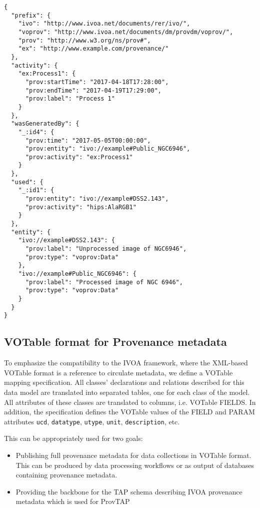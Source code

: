 \begin{verbatim}
{
  "prefix": {
    "ivo": "http://www.ivoa.net/documents/rer/ivo/",
    "voprov": "http://www.ivoa.net/documents/dm/provdm/voprov/",
    "prov": "http://www.w3.org/ns/prov#",
    "ex": "http://www.example.com/provenance/"
  },
  "activity": {
    "ex:Process1": {
      "prov:startTime": "2017-04-18T17:28:00",
      "prov:endTime": "2017-04-19T17:29:00",
      "prov:label": "Process 1"
    }
  },
  "wasGeneratedBy": {
    "_:id4": {
      "prov:time": "2017-05-05T00:00:00",
      "prov:entity": "ivo://example#Public_NGC6946",
      "prov:activity": "ex:Process1"
    }
  },
  "used": {
    "_:id1": {
      "prov:entity": "ivo://example#DSS2.143",
      "prov:activity": "hips:AlaRGB1"
    }
  },
  "entity": {
    "ivo://example#DSS2.143": {
      "prov:label": "Unprocessed image of NGC6946",
      "prov:type": "voprov:Data"
    },
    "ivo://example#Public_NGC6946": {
      "prov:label": "Processed image of NGC 6946",
      "prov:type": "voprov:Data"
    }
  }
}
\end{verbatim}




\subsection{VOTable format for Provenance metadata} 


To emphasize the compatibility to the IVOA framework, where the XML-based VOTable
format is a reference to circulate metadata, we define a VOTable mapping
specification. All classes' declarations and relations described for this data model are translated into separated tables, one for each class of the model.
All attributes of these classes are
translated to columns, i.e. VOTable FIELDS. In addition, the specification
defines the VOTable values of the FIELD and PARAM attributes \texttt{ucd},
\texttt{datatype}, \texttt{utype}, \texttt{unit}, \texttt{description}, etc.

This can be appropriately used for two goals:
\begin{itemize}
	\item Publishing full provenance metadata for data collections in VOTable format. This can be produced by data processing workflows or as output of databases containing provenance metadata.
	\item Providing the backbone for the TAP schema describing IVOA provenance metadata which is used for ProvTAP 
\end{itemize}


